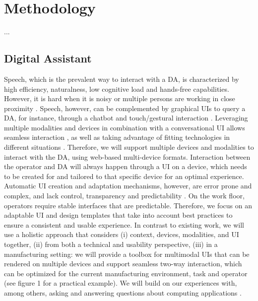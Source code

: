 \section{Methodology}\label{sec:Methodology}

...

\subsection{Digital Assistant}\label{sec:DA}

Speech, which is the prevalent way to interact with a DA, is characterized by high efficiency, naturalness, low cognitive load and hands-free capabilities. However, it is hard when it is noisy or multiple persons are working in close proximity \cite{hou2018VisualFeedbackDesign}. Speech, however, can be complemented by graphical UIs to query a DA, for instance, through a chatbot and touch/gestural interaction \cite{belkadi2020IntelligentAssistantSystem,klopfenstein2017RiseBotsSurvey,heller2019TaskHerderWearableMinimal}. Leveraging multiple modalities and devices in combination with a conversational UI allows seamless interaction \cite{white2019MultideviceDigitalAssistance}, as well as taking advantage of fitting technologies in different situations \cite{heinz2018MultideviceAssistiveSystem}. Therefore, we will support multiple devices and modalities to interact with the DA, using web-based multi-device formats. Interaction between the operator and DA will always happen through a UI on a device, which needs to be created for and tailored to that specific device for an optimal experience. Automatic UI creation and adaptation mechanisms, however, are error prone and complex, and lack control, transparency and predictability \cite{lavie2010BenefitsCostsAdaptive}. On the work floor, operators require stable interfaces that are predictable. Therefore, we focus on an adaptable UI \cite{bunt2007SupportingInterfaceCustomization} and design templates that take into account best practices \cite{ratzka2013UserInterfacePatterns} to ensure a consistent and usable experience. In contrast to existing work, we will use a holistic approach that considers (i) context, devices, modalities, and UI together, (ii) from both a technical and usability perspective, (iii) in a manufacturing setting: we will provide a toolbox for multimodal UIs that can be rendered on multiple devices and support seamless two-way interaction, which can be optimized for the current manufacturing environment, task and operator (see figure 1 for a practical example). We will build on our experiences with, among others, asking and answering questions about computing applications \cite{vermeulen2010PervasiveCrystalAskingAnswering}.


